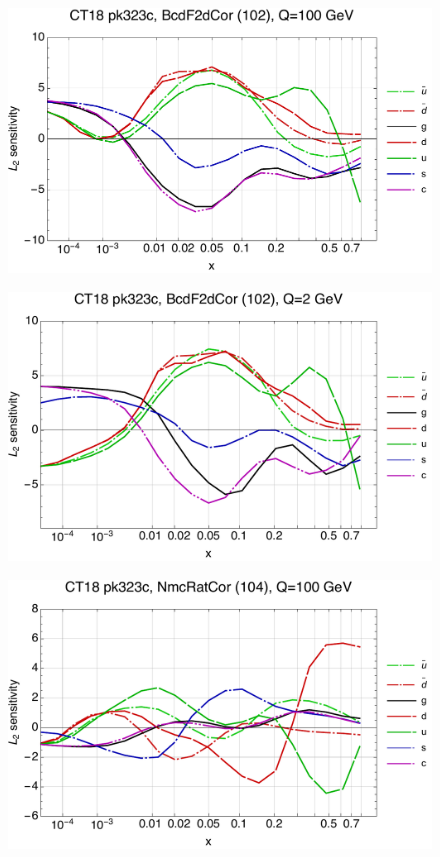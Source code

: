 \documentclass[10pt,aps,prd,floatfix,titlepage]{revtex4}
\begin{document}
\begin{figure}
\includegraphics[width=\textwidth,height=0.44\textheight,keepaspectratio]{1/102_ct18nn_L2_q100_Sf_1.pdf}
\caption{}
\end{figure}
\begin{figure}
\includegraphics[width=\textwidth,height=0.44\textheight,keepaspectratio]{1/102_ct18nn_L2_q2_Sf_1.pdf}
\caption{}
\end{figure}
\clearpage
\begin{figure}
\includegraphics[width=\textwidth,height=0.44\textheight,keepaspectratio]{1/104_ct18nn_L2_q100_Sf_1.pdf}
\caption{}
\end{figure}
\end{document}

